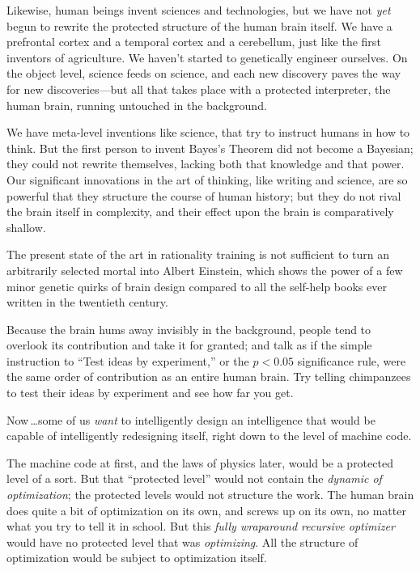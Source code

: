 {{
 Likewise, human beings invent sciences and technologies, but we
have not \textit{yet} begun to rewrite the protected structure of the
human brain itself. We have a prefrontal cortex and a temporal cortex
and a cerebellum, just like the first inventors of agriculture. We
haven't started to genetically engineer ourselves. On
the object level, science feeds on science, and each new discovery
paves the way for new discoveries---but all that takes place with a
protected interpreter, the human brain, running untouched in the
background.}

{
 We have meta-level inventions like science, that try to instruct
humans in how to think. But the first person to invent
Bayes's Theorem did not become a Bayesian; they could
not rewrite themselves, lacking both that knowledge and that power. Our
significant innovations in the art of thinking, like writing and
science, are so powerful that they structure the course of human
history; but they do not rival the brain itself in complexity, and
their effect upon the brain is comparatively shallow.}

{
 The present state of the art in rationality training is not
sufficient to turn an arbitrarily selected mortal into Albert Einstein,
which shows the power of a few minor genetic quirks of brain design
compared to all the self-help books ever written in the twentieth
century.}

{
 Because the brain hums away invisibly in the background, people
tend to overlook its contribution and take it for granted; and talk as
if the simple instruction to ``Test ideas by
experiment,'' or the $p < 0.05$ significance
rule, were the same order of contribution as an entire human brain. Try
telling chimpanzees to test their ideas by experiment and see how far
you get.}

{
 Now\,\ldots some of us \textit{want} to intelligently design an
intelligence that would be capable of intelligently redesigning itself,
right down to the level of machine code.}

{
 The machine code at first, and the laws of physics later, would be
a protected level of a sort. But that ``protected
level'' would not contain the \textit{dynamic of
optimization}; the protected levels would not structure the work. The
human brain does quite a bit of optimization on its own, and screws up
on its own, no matter what you try to tell it in school. But this
\textit{fully wraparound recursive optimizer} would have no protected
level that was \textit{optimizing}. All the structure of optimization
would be subject to optimization itself.}

}
